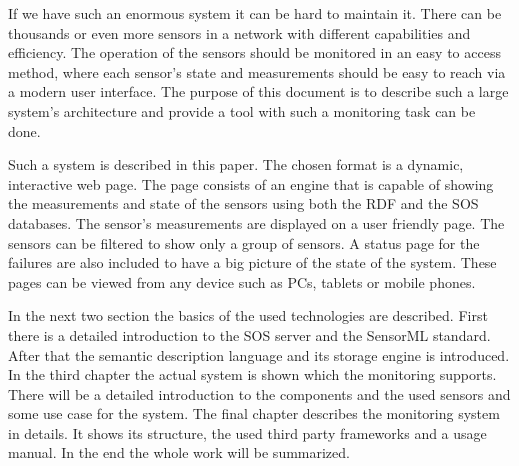 If we have such an enormous system it can be hard to maintain it. There can be thousands or even more sensors in a network with different capabilities and efficiency. The operation of the sensors should be monitored in an easy to access method, where each sensor's state and measurements should be easy to reach via a modern user interface. The purpose of this document is to describe such a large system's architecture and provide a tool with such a monitoring task can be done.

Such a system is described in this paper. The chosen format is a dynamic, interactive web page. The page consists of an engine that is capable of showing the measurements and state of the sensors using both the RDF and the SOS databases. The sensor's measurements are displayed on a user friendly page. The sensors can be filtered to show only a group of sensors. A status page for the failures are also included to have a big picture of the state of the system. These pages can be viewed from any device such as PCs, tablets or mobile phones.

In the next two section the basics of the used technologies are described. First there is a detailed introduction to the SOS server and the SensorML standard. After that the semantic description language and its storage engine is introduced. 
In the third chapter the actual system is shown which the monitoring supports. 
There will be a detailed introduction to the components and the used sensors and some use case for the system. The final chapter describes the monitoring system in details. It shows its structure, the used third party frameworks and a usage manual. In the end the whole work will be summarized. 

